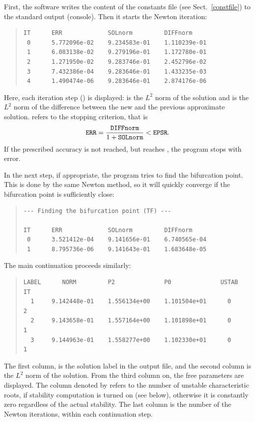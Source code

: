 \documentclass[10pt,a4paper]{ddedoc}
\begin{document}
First, the software writes the content of the constants file (see Sect.\
\ref{constfile}) to the standard output (console). Then it starts the Newton
iteration:
{ \small \begin{quote} \begin{lstlisting}[basicstyle=\tt,frame=single]
IT      ERR             SOLnorm         DIFFnorm
 0      5.772096e-02    9.234583e-01    1.110239e-01
 1      6.083138e-02    9.279196e-01    1.172780e-01
 2      1.271950e-02    9.283746e-01    2.452796e-02
 3      7.432386e-04    9.283646e-01    1.433235e-03
 4      1.490474e-06    9.283646e-01    2.874176e-06
\end{lstlisting} \end{quote} } \noindent
Here, each iteration step () is displayed:  is the $L^2$
norm of the solution and \funp{DIFFnorm} is the $L^2$ norm of the difference
between the new and the previous approximate solution. \funp{ERR} refers to the
stopping criterion, that is
\[
	{\tt ERR} = \frac{{\tt DIFFnorm}}{1+{\tt SOLnorm}} < {\tt EPSR}.
\]
If the prescribed accuracy is not reached, but  reaches ,
the program stops with error.

In the next step, if appropriate, the program tries to find the bifurcation
point. This is done by the same Newton method, so it will quickly converge if
the bifurcation point is sufficiently close:
{ \small \begin{quote} \begin{lstlisting}[basicstyle=\tt,frame=single]
--- Finding the bifurcation point (TF) ---

IT      ERR             SOLnorm         DIFFnorm
 0      3.521412e-04    9.141656e-01    6.740565e-04
 1      8.795736e-06    9.141643e-01    1.683648e-05
\end{lstlisting} \end{quote} } \noindent

The main continuation proceeds similarly:
{ \small \begin{quote} \begin{lstlisting}[basicstyle=\tt,frame=single]
LABEL      NORM         P2              P0              USTAB   IT
  1     9.142448e-01    1.556134e+00    1.101504e+01      0     2
  2     9.143658e-01    1.557164e+00    1.101898e+01      0     1
  3     9.144963e-01    1.558277e+00    1.102330e+01      0     1
\end{lstlisting} \end{quote} } \noindent
The first column,  is the solution label in the output file, and
the second column is the $L^2$ norm of the solution. From the third column on,
the free parameters are displayed. The column denoted by \funp{USTAB} refers to
the number of unstable characteristic roots, if stability computation is turned
on (see \funp{STAB} below), otherwise it is constantly zero regardless of the actual stability. 
The last column is the number of the Newton iterations, within each continuation step.
\end{document}
